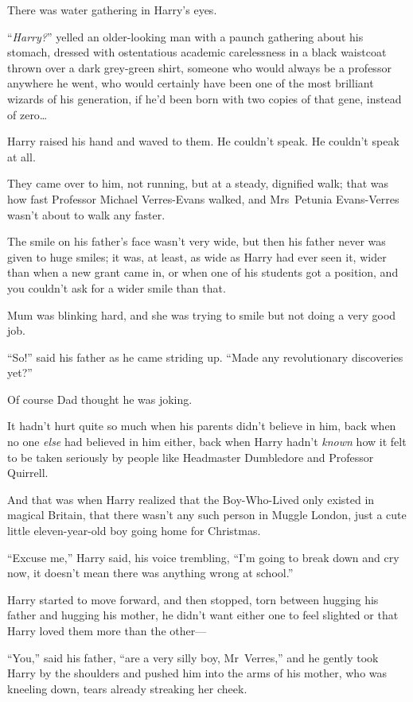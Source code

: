 There was water gathering in Harry’s eyes.

“\emph{Harry?}” yelled an older-looking man with a paunch gathering about his stomach, dressed with ostentatious academic carelessness in a black waistcoat thrown over a dark grey-green shirt, someone who would always be a professor anywhere he went, who would certainly have been one of the most brilliant wizards of his generation, if he’d been born with two copies of that gene, instead of zero…

Harry raised his hand and waved to them. He couldn’t speak. He couldn’t speak at all.

They came over to him, not running, but at a steady, dignified walk; that was how fast Professor Michael Verres-Evans walked, and Mrs~Petunia Evans-Verres wasn’t about to walk any faster.

The smile on his father’s face wasn’t very wide, but then his father never was given to huge smiles; it was, at least, as wide as Harry had ever seen it, wider than when a new grant came in, or when one of his students got a position, and you couldn’t ask for a wider smile than that.

Mum was blinking hard, and she was trying to smile but not doing a very good job.

“So!” said his father as he came striding up. “Made any revolutionary discoveries yet?”

Of course Dad thought he was joking.

It hadn’t hurt quite so much when his parents didn’t believe in him, back when no one \emph{else} had believed in him either, back when Harry hadn’t \emph{known} how it felt to be taken seriously by people like Headmaster Dumbledore and Professor Quirrell.

And that was when Harry realized that the Boy-Who-Lived only existed in magical Britain, that there wasn’t any such person in Muggle London, just a cute little eleven-year-old boy going home for Christmas.

“Excuse me,” Harry said, his voice trembling, “I’m going to break down and cry now, it doesn’t mean there was anything wrong at school.”

Harry started to move forward, and then stopped, torn between hugging his father and hugging his mother, he didn’t want either one to feel slighted or that Harry loved them more than the other—

“You,” said his father, “are a very silly boy, Mr~Verres,” and he gently took Harry by the shoulders and pushed him into the arms of his mother, who was kneeling down, tears already streaking her cheek.

